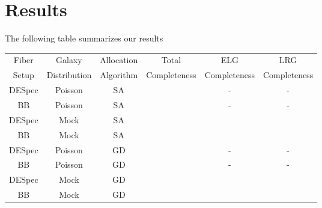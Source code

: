 \documentclass{article}
\begin{document}
\section{Results}

The following table summarizes our results

\begin{table}
\begin{tabular}{cccccc}\hline
Fiber & Galaxy & Allocation & Total & ELG & LRG\\
Setup & Distribution & Algorithm & Completeness & Completeness& Completeness\\\hline
DESpec & Poisson & SA & & -& -\\
BB & Poisson & SA & & -& -\\
DESpec & Mock & SA & & &\\
BB & Mock & SA & & &\\
DESpec & Poisson & GD & & -& -\\
BB & Poisson & GD & & -&-\\
DESpec & Mock & GD & & &\\
BB & Mock & GD & & &\\\hline
\end{tabular}
\label{Summary of the results.}
\end{table}
\end{document}
